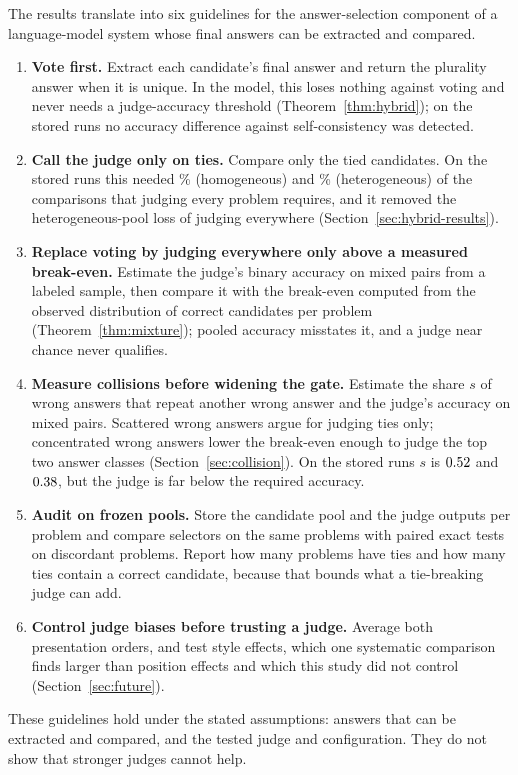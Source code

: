\documentclass[preprint,11pt,number,sort&compress]{elsarticle}
\begin{document}
The results translate into six guidelines for the answer-selection component of a
language-model system whose final answers can be extracted and compared.
\begin{enumerate}
\item \textbf{Vote first.} Extract each candidate's final answer and return the plurality
answer when it is unique. In the model, this loses nothing against voting and
never needs a judge-accuracy threshold (Theorem~\ref{thm:hybrid}); on the stored
runs no accuracy difference against self-consistency was detected.
\item \textbf{Call the judge only on ties.} Compare only the tied candidates. On the stored runs this
needed \HybHomCallShare\% (homogeneous) and \HybHetCallShare\% (heterogeneous) of the
comparisons that judging every problem requires, and it removed the heterogeneous-pool
loss of judging everywhere (Section~\ref{sec:hybrid-results}).
\item \textbf{Replace voting by judging everywhere only above a measured break-even.}
Estimate the judge's binary accuracy on mixed pairs from a labeled sample, then compare it
with the break-even computed from the observed distribution of correct candidates per problem
(Theorem~\ref{thm:mixture}); pooled accuracy misstates it, and a judge near chance never qualifies.
\item \textbf{Measure collisions before widening the gate.} Estimate the share $s$ of wrong
answers that repeat another wrong answer and the judge's accuracy on mixed pairs. Scattered wrong
answers argue for judging ties only; concentrated wrong answers lower the break-even enough to
judge the top two answer classes (Section~\ref{sec:collision}). On the stored runs $s$ is
$0.52$ and $0.38$, but the judge is far below the required accuracy.
\item \textbf{Audit on frozen pools.} Store the candidate pool and the judge outputs per problem and
compare selectors on the same problems with paired exact tests on discordant problems. Report
how many problems have ties and how many ties contain a correct candidate, because that
bounds what a tie-breaking judge can add.
\item \textbf{Control judge biases before trusting a judge.} Average both presentation orders, and test
style effects, which one systematic comparison finds larger than position effects
\citep{soumik2026judging} and which this study did not control (Section~\ref{sec:future}).
\end{enumerate}
These guidelines hold under the stated assumptions: answers that can be extracted and compared, and
the tested judge and configuration. They do not show that stronger judges cannot help.
\end{document}
